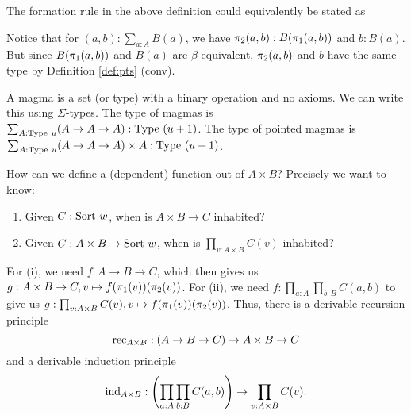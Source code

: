 \begin{rem}
    The formation rule in the above definition could equivalently be stated as
    \begin{prooftree}
    \end{prooftree}
\end{rem}

\begin{rem}
    Notice that for $(a, b) : \sum_{a : A} B(a)$, we have $\piproj{2}{a, b} : B(\piproj{1}{a, b})$ and $b : B(a)$.
    But since $B(\piproj{1}{a, b})$ and $B(a)$ are $\beta$-equivalent, $\piproj{2}{a, b}$ and $b$ have the same type by Definition \ref{def:pts} (conv).
\end{rem}

\begin{example}
    A \alert{magma} is a set (or type) with a binary operation and no axioms.
    We can write this using $\Sigma$-types.
    The type of magmas is $\sum_{A : \typeu{u}} (A \to A \to A) : \typeu{(u + 1)}$.
    The type of pointed magmas is $\sum_{A : \typeu{u}} (A \to A \to A) \times A : \typeu{(u + 1)}$.
\end{example}

\begin{rem}
    How can we define a (dependent) function out of $A \times B$?
    Precisely we want to know:
    \begin{enumerate}
        \item Given $C : \sortu{w}$, when is $A \times B \to C$ inhabited?
        \item Given $C : A \times B \to \sortu{w}$, when is $\prod_{v : A \times B} C(v)$ inhabited?
    \end{enumerate}
    For (i), we need $f : A \to B \to C$, which then gives us $g : A \times B \to C, v \mapsto f(\piproj{1}{v})(\piproj{2}{v})$.
    For (ii), we need $f : \prod_{a : A}\prod_{b : B}C(a, b)$ to give us $g : \prod_{v : A \times B} C(v), v \mapsto f(\piproj{1}{v})(\piproj{2}{v})$.
    Thus, there is a derivable recursion principle
    \begin{equation*}
        \rec{A \times B} : (A \to B \to C) \to A \times B \to C
    \end{equation*}
    and a derivable induction principle
    \begin{equation*}
        \ind{A \times B} : \left(\prod_{a : A}\prod_{b : B}C(a, b)\right) \to \prod_{v : A \times B} C(v).
    \end{equation*}
\end{rem}

